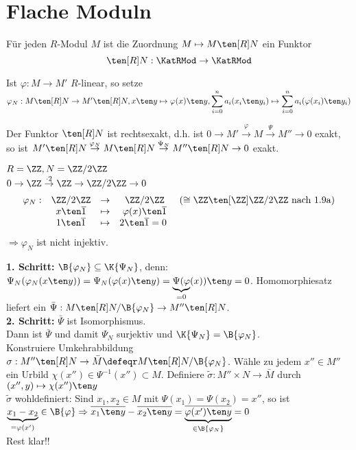 \section{Flache Moduln}

\begin{Bem}
  Für jeden $R$-Modul $M$ ist die Zuordnung $M \mapsto M \ten[R] N$ ein Funktor
  \[
  \ten[R] N: \KatRMod \to \KatRMod
  \]
\end{Bem}

\begin{Bew} 
  Ist $\varphi: M \to M'$ $R$-linear, so setze $\varphi_N: M \ten[R] N \to M'
  \ten[R] N, x \ten y \mapsto \varphi(x) \ten y, \displaystyle
  \sum_{i=0}^na_i(x_i \ten y_i) \mapsto \sum_{i=0}^n a_i(\varphi(x_i) \ten y_i)$
\end{Bew}

\begin{Prop}
\label{1.12}
  Der Funktor $\ten[R] N$ ist rechtsexakt, d.h. ist $0 \to M'
  \overset{\varphi}{\to} M \overset{\Psi}{\to} M'' \to 0$ exakt, so ist $ M'
  \ten[R] N \overset{\varphi_N}{\to} M \ten[R] N \overset{\Psi_N}{\to} M'' \ten[R] N
  \to 0$ exakt.
\end{Prop}

\begin{nnBsp} 
  $R = \ZZ, N = \ZZ/2 \ZZ$\\
  $0 \to \ZZ \overset{ \cdot 2}{\to} \ZZ \to \ZZ/2
  \ZZ \to 0$
  \[
  \begin{matrix}
  \varphi_N:& \ZZ/2 \ZZ &\to& \ZZ / 2 \ZZ &(\cong \ZZ \ten[\ZZ] \ZZ / 2 \ZZ
  \text{ nach 1.9a})\\
  &x\ten\overline 1 & \mapsto & \varphi(x)\ten\overline 1&\\
  &1\ten\overline 1&\mapsto&2\ten\overline 1=0\
  \end{matrix}
  \]
  $\Rightarrow \varphi_N$ ist nicht injektiv.
\end{nnBsp}

\begin{Bew} 
  \textbf{1. Schritt:} $\B{\varphi_N} \subseteq \K{\Psi_N}$,
  denn: $\Psi_N(\varphi_N(x \ten y)) = \Psi_N(\varphi(x) \ten y) =
  \underset{=0}{\underbrace{\Psi(\varphi}}(x)) \ten y = 0$. Homomorphiesatz
  liefert ein $\bar{\Psi}: M \ten[R] N/\B{\varphi_N} \to M'' \ten[R]
  N$.\\
  \textbf{2. Schritt:} $\bar{\Psi}$ ist Isomorphismus.\\
  Dann ist $\bar{\Psi}$ und damit $\Psi_N$ surjektiv und $\K{\Psi_N} =
  \B{\varphi_N}$.\\
  Konstruiere Umkehrabbildung $\sigma: M'' \ten[R] N \to \bar{M} \defeqr M
  \ten[R] N/\B{\varphi_N}$. Wähle zu jedem $x'' \in M''$ ein Urbild
  $\chi(x'') \in \Psi^{-1}(x'') \subset M$.
  Definiere $\tilde{\sigma}: M'' \times N \to \bar{M}$ durch $(x'', y) \mapsto
  \chi(x'') \ten y$\\
  $\tilde{\sigma}$ wohldefiniert:
  Sind $x_1,x_2 \in M$ mit $\Psi(x_1) = \Psi(x_2) = x''$, so ist $\underset{= \varphi(x')
  }{\underbrace{x_1 - x_2}} \in \B{\varphi} \Rightarrow \overline{x_1
  \ten y} - \overline{x_2 \ten y} = \underset{\in \B{\varphi_N}
  }{\underbrace{\overline{\varphi(x') \ten y}}} = 0$\\
  Rest klar!!
\end{Bew}

